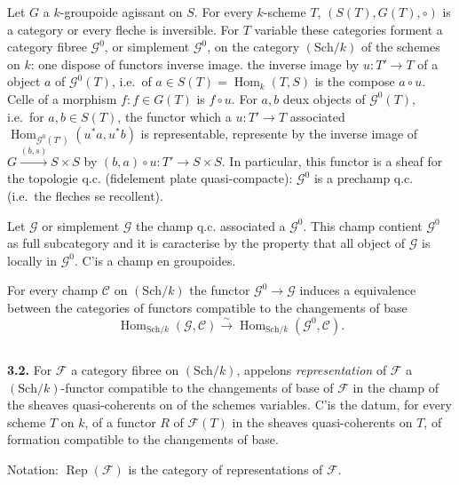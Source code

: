 \documentclass[12pt,a4paper]{article}
\theoremstyle{plain}
\theoremstyle{definition}
\theoremstyle{remark}
\DeclareMathOperator{\Hom}{Hom}
\DeclareMathOperator{\Rep}{Rep}
\begin{document}
Let $G$ a $k$-groupoide agissant on $S$. For every $k$-scheme $T$, $(S(T), G(T), \circ)$ is a category or every fleche is inversible. For $T$ variable these categories forment a category fibree $\mathcal{G}^0$, or simplement $\mathcal{G}^0$, on the category $(\mathrm{Sch}/k)$ of the schemes on $k$: one dispose of functors inverse image. the inverse image by $u : T' \to T$ of a object $a$ of $\mathcal{G}^0(T)$, i.e.~of $a \in S(T) = \Hom_k(T,S)$ is the compose $a \circ u$. Celle of a morphism $f : f \in G(T)$ is $f \circ u$. For $a,b$ deux objects of $\mathcal{G}^0(T)$, i.e.~for $a,b \in S(T)$, the functor which a $u : T' \to T$ associated $\Hom_{\mathcal{G}^0(T')}(u^*a, u^*b)$ is representable, represente by the inverse image of $G \xrightarrow{(b,s)} S \times S$ by $(b,a) \circ u : T' \to S \times S$. In particular, this functor is a sheaf for the topologie q.c. (fidelement plate quasi-compacte): $\mathcal{G}^0$ is a prechamp q.c. (i.e.~the fleches se recollent).

Let $\mathcal{G}$ or simplement $\mathcal{G}$ the champ q.c. associated a $\mathcal{G}^0$. This champ contient $\mathcal{G}^0$ as full subcategory and it is caracterise by the property that all object of $\mathcal{G}$ is locally in $\mathcal{G}^0$. C'is a champ en groupoides.

For every champ $\mathcal{C}$ on $(\mathrm{Sch}/k)$ the functor $\mathcal{G}^0 \to \mathcal{G}$ induces a equivalence between the categories of functors compatible to the changements of base
\begin{equation}\label{eq:3.1.1}
\Hom_{\mathrm{Sch}/k}(\mathcal{G}, \mathcal{C}) \xrightarrow{\sim} \Hom_{\mathrm{Sch}/k}(\mathcal{G}^0, \mathcal{C}).
\end{equation}

\subsection{}

\textbf{3.2.} For $\mathcal{F}$ a category fibree on $(\mathrm{Sch}/k)$, appelons \emph{representation} of $\mathcal{F}$ a $(\mathrm{Sch}/k)$-functor compatible to the changements of base of $\mathcal{F}$ in the champ of the sheaves quasi-coherents on of the schemes variables. C'is the datum, for every scheme $T$ on $k$, of a functor $R$ of $\mathcal{F}(T)$ in the sheaves quasi-coherents on $T$, of formation compatible to the changements of base.

Notation: $\Rep(\mathcal{F})$ is the category of representations of $\mathcal{F}$.
\end{document}
